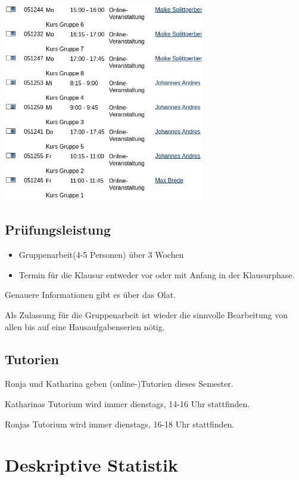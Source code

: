 \documentclass[
]{book}
\begin{document}
\begin{center}\includegraphics[width=250pt]{imgs/univis} \end{center}

\hypertarget{pruxfcfungsleistung-1}{%
\subsection{Prüfungsleistung}\label{pruxfcfungsleistung-1}}

\begin{itemize}
\item
  Gruppenarbeit(4-5 Personen) über 3 Wochen
\item
  Termin für die Klausur entweder vor oder mit Anfang in der Klausurphase.
\end{itemize}

Genauere Informationen gibt es über das Olat.

Als Zulassung für die Gruppenarbeit ist wieder die sinnvolle Bearbeitung von allen bis auf eine Hausaufgabenserien nötig.

\hypertarget{tutorien}{%
\subsection{Tutorien}\label{tutorien}}

Ronja und Katharina geben (online-)Tutorien dieses Semester.

Katharinas Tutorium wird immer dienstags, 14-16 Uhr stattfinden.

Ronjas Tutorium wird immer dienstags, 16-18 Uhr stattfinden.

\hypertarget{deskriptive-statistik}{%
\section{Deskriptive Statistik}\label{deskriptive-statistik}}
\end{document}
